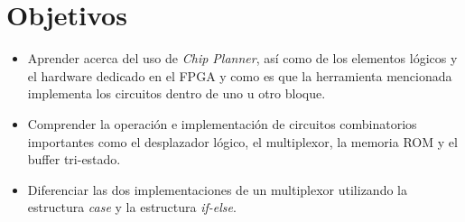\section{Objetivos \label{sec:obj}}


\begin{itemize} 
	\item Aprender acerca del uso de \textit{Chip Planner}, así como de los elementos lógicos y el hardware dedicado en el FPGA y como es que la herramienta mencionada implementa los circuitos dentro de uno u otro bloque.
	
	\item Comprender la operación e implementación de circuitos combinatorios importantes como el desplazador lógico, el multiplexor, la memoria ROM y el buffer tri-estado.
	
	\item Diferenciar las dos implementaciones de un multiplexor utilizando la estructura \textit{case} y la estructura \textit{if-else}.
\end{itemize}